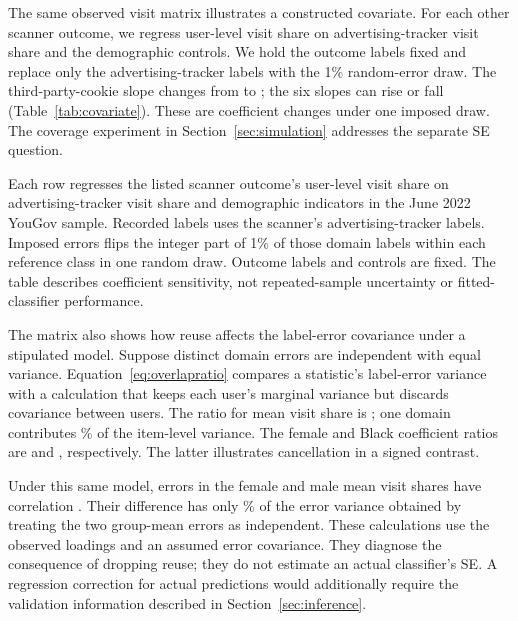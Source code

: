 The same observed visit matrix illustrates a constructed covariate.
For each other scanner outcome, we regress user-level visit share on
advertising-tracker visit share and the demographic controls. We hold the
outcome labels fixed and replace only the advertising-tracker labels with
the 1\% random-error draw. The third-party-cookie slope changes from
\CompleteCovariateCoefficient{} to \ImposedCovariateCoefficient{};
the six slopes can rise or fall (Table~\ref{tab:covariate}).
These are coefficient changes under one imposed draw. The coverage
experiment in Section~\ref{sec:simulation} addresses the separate SE question.

\begin{table}[htbp]
\centering\small
\caption{An aggregate covariate under imposed label errors in the browsing sample}
\label{tab:covariate}

\par\smallskip
\begin{minipage}{\linewidth}\footnotesize
Each row regresses the listed scanner outcome's user-level visit share on
advertising-tracker visit share and demographic indicators in the June 2022
YouGov sample. Recorded labels uses the scanner's advertising-tracker labels.
Imposed errors flips the integer part of 1\% of those domain labels within
each reference class in one random draw. Outcome labels and controls are
fixed. The table describes coefficient sensitivity, not repeated-sample
uncertainty or fitted-classifier performance.
\end{minipage}
\end{table}
\FloatBarrier

The matrix also shows how reuse affects the label-error covariance under
a stipulated model. Suppose distinct domain errors are independent with
equal variance. Equation~\eqref{eq:overlapratio} compares a statistic's
label-error variance with a calculation that keeps each user's marginal
variance but discards covariance between users. The ratio for mean visit
share is \MeanShareVarianceRatio{}; one domain contributes
\MeanShareLargestItem{}\% of the item-level variance. The female and Black
coefficient ratios are \FemaleShareVarianceRatio{} and
\BlackShareVarianceRatio{}, respectively. The latter illustrates
cancellation in a signed contrast.

Under this same model, errors in the female and male mean visit shares
have correlation \GroupErrorCorrelation{}. Their difference has only
\GroupDifferenceVarianceFraction{}\% of the error variance obtained by
treating the two group-mean errors as independent. These calculations use
the observed loadings and an assumed error covariance. They diagnose the
consequence of dropping reuse; they do not estimate an actual classifier's
SE. A regression correction for actual predictions would additionally
require the validation information described in Section~\ref{sec:inference}.
